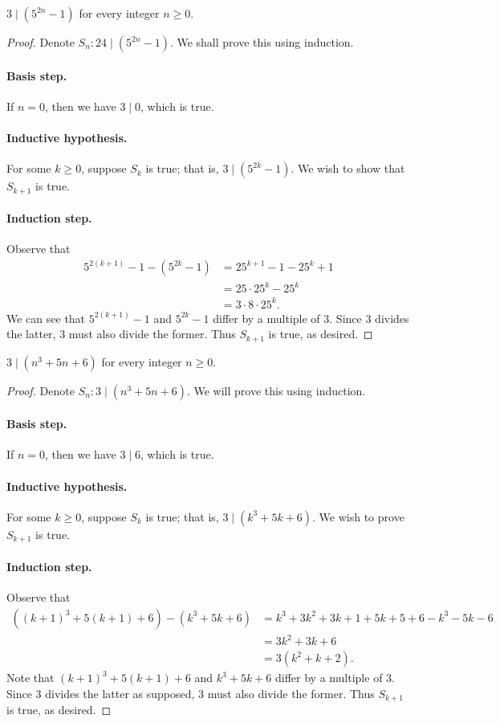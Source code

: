 \documentclass{exam}
\begin{document}
\begin{proposition}{10.10}
    $3\mid(5^{2n}-1)$ for every integer $n\ge0$.
\end{proposition}

\begin{proof}
    Denote $S_n:24\mid(5^{2n}-1)$. We shall prove this using induction.
    \paragraph{Basis step.} If $n = 0$, then we have $3\mid0$, which is true.
    \paragraph{Inductive hypothesis.} For some $k\ge0$, suppose $S_k$ is true; that is, $3\mid(5^{2k}-1)$. We wish to show that $S_{k+1}$ is true.
    \paragraph{Induction step.} Observe that
    \begin{align*}
        5^{2(k+1)}-1-(5^{2k}-1)&=25^{k+1}-1-25^k+1\\
        &=25\cdot25^k-25^k\\
        &=3\cdot8\cdot25^k.
    \end{align*}
    We can see that $5^{2(k+1)}-1$ and $5^{2k}-1$ differ by a multiple of 3. Since $3$ divides the latter, $3$ must also divide the former. Thus $S_{k+1}$ is true, as desired.
\end{proof}

\begin{proposition}{10.11}
    $3\mid(n^3+5n+6)$ for every integer $n \ge 0$.
\end{proposition}

\begin{proof}
    Denote $S_n:3\mid(n^3+5n+6)$. We will prove this using induction.
    \paragraph{Basis step.} If $n=0$, then we have $3\mid6$, which is true.
    \paragraph{Inductive hypothesis.} For some $k\ge0$, suppose $S_k$ is true; that is, $3\mid(k^3+5k+6)$. We wish to prove $S_{k+1}$ is true.
    \paragraph{Induction step.} Observe that
    \begin{align*}
        ((k+1)^3+5(k+1)+6) - (k^3+5k+6) &=k^3+3k^2+3k+1+5k+5+6-k^3-5k-6\\
        &=3k^2+3k+6\\
        &=3(k^2+k+2).
    \end{align*}
    Note that $(k+1)^3+5(k+1)+6$ and $k^3+5k+6$ differ by a multiple of 3. Since 3 divides the latter as supposed, 3 must also divide the former. Thus $S_{k+1}$ is true, as desired.
\end{proof}
\end{document}
